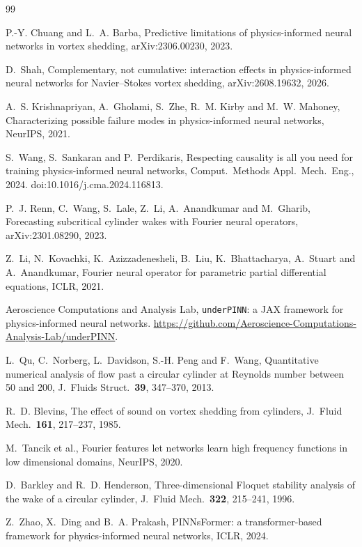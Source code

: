 \documentclass[11pt,a4paper]{article}
\begin{document}
\begin{thebibliography}{99}

P.-Y. Chuang and L.~A. Barba,
Predictive limitations of physics-informed neural networks in vortex shedding,
arXiv:2306.00230, 2023.

D.~Shah, Complementary, not cumulative: interaction effects in
physics-informed neural networks for Navier--Stokes vortex shedding,
arXiv:2608.19632, 2026.

A.~S. Krishnapriyan, A.~Gholami, S.~Zhe, R.~M. Kirby and M.~W. Mahoney,
Characterizing possible failure modes in physics-informed neural networks,
NeurIPS, 2021.

S.~Wang, S.~Sankaran and P.~Perdikaris,
Respecting causality is all you need for training physics-informed neural
networks, Comput.\ Methods Appl.\ Mech.\ Eng., 2024.
doi:10.1016/j.cma.2024.116813.

P.~J. Renn, C.~Wang, S.~Lale, Z.~Li, A.~Anandkumar and M.~Gharib,
Forecasting subcritical cylinder wakes with Fourier neural operators,
arXiv:2301.08290, 2023.

Z.~Li, N.~Kovachki, K.~Azizzadenesheli, B.~Liu, K.~Bhattacharya, A.~Stuart and
A.~Anandkumar, Fourier neural operator for parametric partial differential
equations, ICLR, 2021.

Aeroscience Computations and Analysis Lab, \texttt{underPINN}: a JAX framework
for physics-informed neural networks.
\url{https://github.com/Aeroscience-Computations-Analysis-Lab/underPINN}.

L.~Qu, C.~Norberg, L.~Davidson, S.-H. Peng and F.~Wang,
Quantitative numerical analysis of flow past a circular cylinder at Reynolds
number between 50 and 200, J.\ Fluids Struct.\ \textbf{39}, 347--370, 2013.

R.~D. Blevins, The effect of sound on vortex shedding from cylinders,
J.\ Fluid Mech.\ \textbf{161}, 217--237, 1985.

M.~Tancik et al., Fourier features let networks learn high frequency
functions in low dimensional domains, NeurIPS, 2020.

D.~Barkley and R.~D. Henderson, Three-dimensional Floquet stability analysis
of the wake of a circular cylinder, J.\ Fluid Mech.\ \textbf{322}, 215--241,
1996.

Z.~Zhao, X.~Ding and B.~A. Prakash, PINNsFormer: a transformer-based framework
for physics-informed neural networks, ICLR, 2024.


\end{thebibliography}
\end{document}
